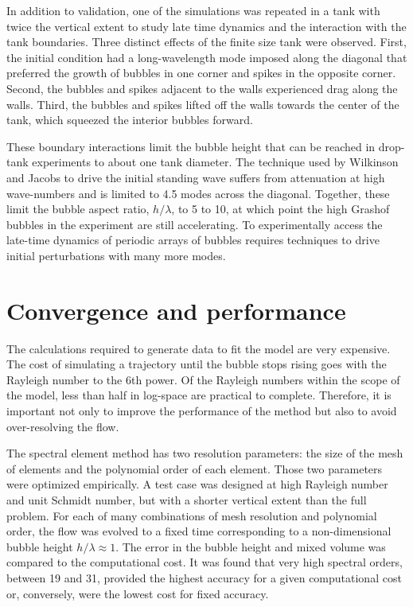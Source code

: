 In addition to validation, one of the simulations was repeated in a tank with twice the vertical extent to study late time dynamics and the interaction with the tank boundaries.
Three distinct effects of the finite size tank were observed.
First, the initial condition had a long-wavelength mode imposed along the diagonal that preferred the growth of bubbles in one corner and spikes in the opposite corner.
Second, the bubbles and spikes adjacent to the walls experienced drag along the walls.
Third, the bubbles and spikes lifted off the walls towards the center of the tank, which squeezed the interior bubbles forward.

These boundary interactions limit the bubble height that can be reached in drop-tank experiments to about one tank diameter.
The technique used by Wilkinson and Jacobs to drive the initial standing wave suffers from attenuation at high wave-numbers and is limited to 4.5 modes across the diagonal.
Together, these limit the bubble aspect ratio, $h/\lambda$, to 5 to 10, at which point the high Grashof bubbles in the experiment are still accelerating.
To experimentally access the late-time dynamics of periodic arrays of bubbles requires techniques to drive initial perturbations with many more modes.

\section{Convergence and performance}

The calculations required to generate data to fit the model are very expensive.
The cost of simulating a trajectory until the bubble stops rising goes with the Rayleigh number to the 6th power.
Of the Rayleigh numbers within the scope of the model, less than half in log-space are practical to complete.
Therefore, it is important not only to improve the performance of the method but also to avoid over-resolving the flow.

The spectral element method has two resolution parameters: the size of the mesh of elements and the polynomial order of each element.
Those two parameters were optimized empirically.
A test case was designed at high Rayleigh number and unit Schmidt number, but with a shorter vertical extent than the full problem.
For each of many combinations of mesh resolution and polynomial order, the flow was evolved to a fixed time corresponding to a non-dimensional bubble height $h / \lambda \approx 1$.
The error in the bubble height and mixed volume was compared to the computational cost.
It was found that very high spectral orders, between 19 and 31, provided the highest accuracy for a given computational cost or, conversely, were the lowest cost for fixed accuracy.

